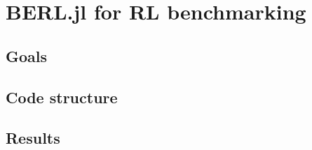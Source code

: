 \chapter{BERL.jl for RL benchmarking}
\label{sec:berl}

\section{Goals}

\section{Code structure}

\section{Results}

